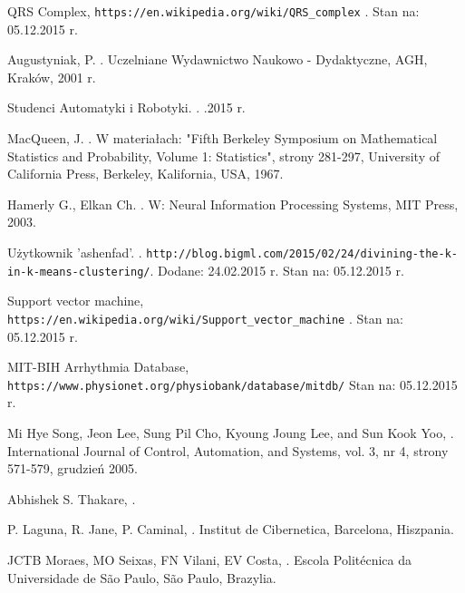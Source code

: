 
\begin{thebibliography}{99} %

 
QRS Complex,
\newblock \texttt{https://en.wikipedia.org/wiki/QRS\_complex} .
\newblock Stan na: 05.12.2015 r.

Augustyniak, P.
.
\newblock Uczelniane Wydawnictwo Naukowo - Dydaktyczne, AGH, Kraków, 2001 r.


Studenci Automatyki i Robotyki.
.
.2015 r.

MacQueen, J.
.
\newblock W materiałach: "Fifth Berkeley Symposium on Mathematical Statistics and Probability, Volume 1: Statistics", strony 281-297,
\newblock University of California Press, Berkeley, Kalifornia, USA, 1967. 

Hamerly G., Elkan Ch.
.
\newblock W: Neural Information Processing Systems,
\newblock MIT Press, 2003.

Użytkownik 'ashenfad'.
.
\newblock \texttt{http://blog.bigml.com/2015/02/24/divining-the-k-in-k-means-clustering/}. 
\newblock Dodane: 24.02.2015 r.
\newblock Stan na: 05.12.2015 r.

Support vector machine,
\newblock \texttt{https://en.wikipedia.org/wiki/Support\_vector\_machine} .
\newblock Stan na: 05.12.2015 r.

MIT-BIH Arrhythmia Database,
\newblock \texttt{https://www.physionet.org/physiobank/database/mitdb/}
\newblock Stan na: 05.12.2015 r.

Mi Hye Song, Jeon Lee, Sung Pil Cho, Kyoung Joung Lee, and Sun Kook Yoo,
.
\newblock 
International Journal of Control, Automation, and Systems, vol. 3, nr 4, strony 571-579, grudzień 2005.

Abhishek S. Thakare,
.

P. Laguna, R. Jane, P. Caminal,
.
\newblock Institut de Cibernetica, Barcelona, Hiszpania.

JCTB Moraes, MO Seixas, FN Vilani, EV Costa,
.
\newblock Escola Politécnica da Universidade de São Paulo, São Paulo, Brazylia.

\end{thebibliography}